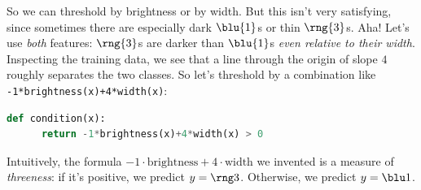   So we can threshold by brightness or by width.  But this isn't very
  satisfying, since sometimes there are especially dark ${\blu{1}}$s or
  thin ${\rng{3}}$s.
  Aha!  Let's use \emph{both} features: ${\rng{3}}$s are darker than
  ${\blu{1}}$s \emph{even relative to their width}.  Inspecting the
  training data, we see that a line through the origin of slope $4$
  roughly separates the two classes.  So let's
  threshold by a combination like \texttt{-1*brightness(x)+4*width(x)}:
  \begin{minipage}{\linewidth}
  \begin{lstlisting}[language=Python, basicstyle=\footnotesize\ttfamily]
    def condition(x):
      return -1*brightness(x)+4*width(x) > 0
  \end{lstlisting}
  \end{minipage}
  Intuitively, the formula $-1\cdot \text{brightness} +4\cdot\text{width}$ we
  invented is a measure of \emph{threeness}: if it's positive, we predict
  $y={\rng 3}$.  Otherwise, we predict $y={\blu 1}$.



